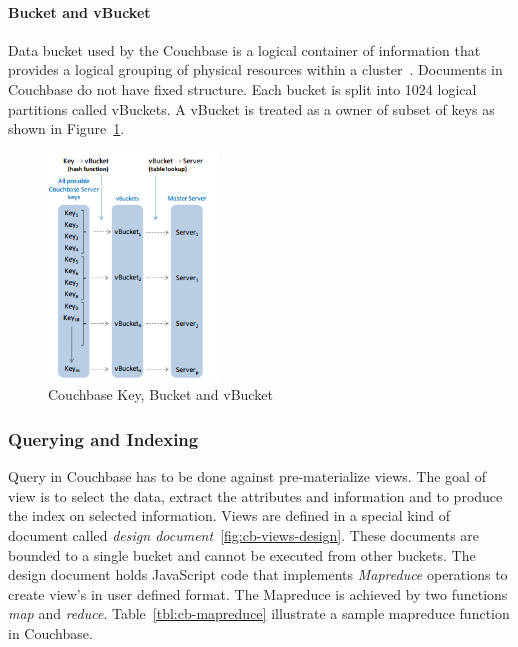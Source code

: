 \paragraph{Bucket and vBucket}
 Data bucket used by the Couchbase is a logical container of information that provides a logical grouping of physical resources within a cluster~\citep{lichtenberg2013nosql}. Documents in Couchbase do not have fixed structure. Each bucket is split into 1024 logical partitions called vBuckets. A vBucket is treated as a owner of subset of keys as shown in Figure~\ref{fig:cb-vbucket}.  

\begin{figure}[h]
	\centering
	\includegraphics[width=0.4\textwidth]{img/vbucket2}
	\caption{ Couchbase Key, Bucket and   vBucket ~\cite{couchbasedocs}}
	\label{fig:cb-vbucket}
\end{figure}




\subsubsection{Querying and Indexing}
Query in Couchbase has to be done against pre-materialize views. The goal of view is to select the data, extract the attributes and information and to produce the index on selected information. Views are defined in a special kind of document called \textit{design document}~\ref{fig:cb-views-design}. These documents are bounded to a single bucket and cannot be executed from other buckets. The design document holds JavaScript code that implements \textit{Mapreduce} operations to create view's in user defined format. The Mapreduce is achieved by two functions \textit{map} and \textit{reduce}. Table~\ref{tbl:cb-mapreduce} illustrate a sample mapreduce function in Couchbase.

